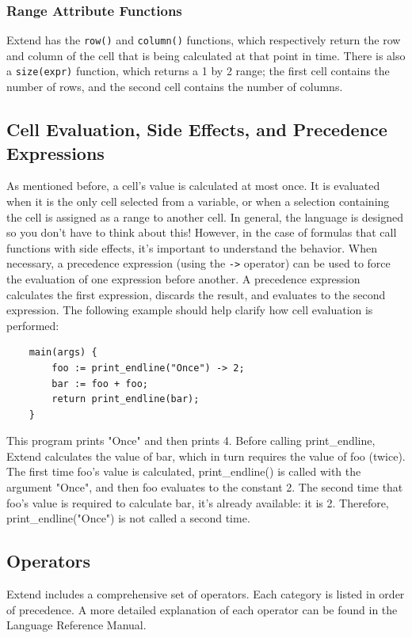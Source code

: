 		\subsubsection{Range Attribute Functions}
		Extend has the \texttt{row()} and \texttt{column()} functions, which respectively return the row and column of the cell that is being calculated at that point in time.
		There is also a \texttt{size(expr)} function, which returns a 1 by 2 range; the first cell contains the number of rows, and the second cell contains the number of columns.

	\subsection{Cell Evaluation, Side Effects, and Precedence Expressions}
	As mentioned before, a cell's value is calculated at most once. It is evaluated when it is the only cell selected from a variable, or when a selection containing the cell is assigned as a range to another cell. In general, the language is designed so you don't have to think about this! However, in the case of formulas that call functions with side effects, it's important to understand the behavior. When necessary, a precedence expression (using the \texttt{->} operator) can be used to force the evaluation of one expression before another. A precedence expression calculates the first expression, discards the result, and evaluates to the second expression. The following example should help clarify how cell evaluation is performed:

	\begin{lstlisting}
	main(args) {
		foo := print_endline("Once") -> 2;
		bar := foo + foo;
		return print_endline(bar);
	}
	\end{lstlisting}

	\medskip \noindent
	This program prints "Once" and then prints 4. Before calling print\_endline, Extend calculates the value of bar, which in turn requires the value of foo (twice). The first time foo's value is calculated, print\_endline() is called with the argument "Once", and then foo evaluates to the constant 2. The second time that foo's value is required to calculate bar, it's already available: it is 2. Therefore, print\_endline("Once") is not called a second time.

	\subsection{Operators}
	Extend includes a comprehensive set of operators. Each category is listed in order of precedence. A more detailed explanation of each operator can be found in the Language Reference Manual.

